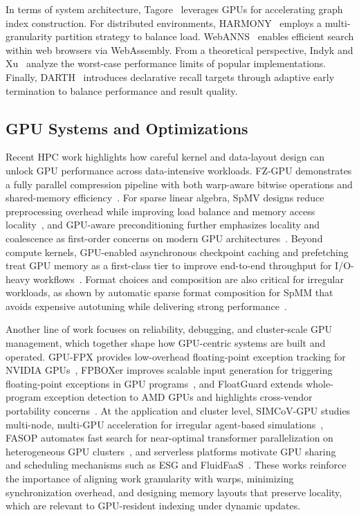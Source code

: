 \documentclass[sigconf,nonacm]{acmart}
\theoremstyle{plain}
\theoremstyle{definition}
\theoremstyle{remark}
\begin{document}
In terms of system architecture, Tagore~\cite{10.1145/3769825} leverages GPUs for accelerating graph index construction. 
For distributed environments, HARMONY~\cite{10.1145/3749167} employs a multi-granularity partition strategy to balance load. 
WebANNS~\cite{10.1145/3726302.3730115} enables efficient search within web browsers via WebAssembly. 
From a theoretical perspective, Indyk and Xu~\cite{DBLP:conf/nips/IndykX23} analyze the worst-case performance limits of popular implementations. 
Finally, DARTH~\cite{10.1145/3749160} introduces declarative recall targets through adaptive early termination to balance performance and result quality.

\subsection{GPU Systems and Optimizations}

Recent HPC work highlights how careful kernel and data-layout design can unlock GPU performance across data-intensive workloads. FZ-GPU demonstrates a fully parallel compression pipeline with both warp-aware bitwise operations and shared-memory efficiency~\cite{10.1145/3588195.3592994}. For sparse linear algebra, SpMV designs reduce preprocessing overhead while improving load balance and memory access locality~\cite{10.1145/3588195.3593002}, and GPU-aware preconditioning further emphasizes locality and coalescence as first-order concerns on modern GPU architectures~\cite{10.1145/3625549.3658683}. Beyond compute kernels, GPU-enabled asynchronous checkpoint caching and prefetching treat GPU memory as a first-class tier to improve end-to-end throughput for I/O-heavy workflows~\cite{10.1145/3588195.3592987}. Format choices and composition are also critical for irregular workloads, as shown by automatic sparse format composition for SpMM that avoids expensive autotuning while delivering strong performance~\cite{10.1145/3731545.3731574}.

Another line of work focuses on reliability, debugging, and cluster-scale GPU management, which together shape how GPU-centric systems are built and operated. GPU-FPX provides low-overhead floating-point exception tracking for NVIDIA GPUs~\cite{10.1145/3588195.3592991}, FPBOXer improves scalable input generation for triggering floating-point exceptions in GPU programs~\cite{10.1145/3625549.3658660}, and FloatGuard extends whole-program exception detection to AMD GPUs and highlights cross-vendor portability concerns~\cite{10.1145/3731545.3731586}. At the application and cluster level, SIMCoV-GPU studies multi-node, multi-GPU acceleration for irregular agent-based simulations~\cite{10.1145/3625549.3658692}, FASOP automates fast search for near-optimal transformer parallelization on heterogeneous GPU clusters~\cite{10.1145/3625549.3658687}, and serverless platforms motivate GPU sharing and scheduling mechanisms such as ESG and FluidFaaS~\cite{10.1145/3625549.3658657,10.1145/3731545.3731580}. These works reinforce the importance of aligning work granularity with warps, minimizing synchronization overhead, and designing memory layouts that preserve locality, which are relevant to GPU-resident indexing under dynamic updates.
\end{document}
